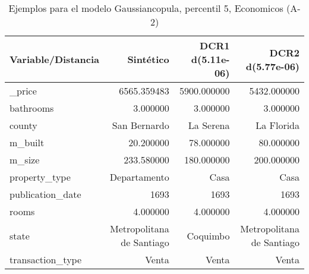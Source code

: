 \begin{table}[H]
\centering
\fontsize{10}{14}\selectfont
\caption{Ejemplos para el modelo Gaussiancopula, percentil 5, Economicos (A-2)}
\label{table-example-economicos-a-2-gaussiancopula-5p}
\begin{tabular}{|l|r|r|r|}
\hline
\rowcolor[gray]{0.8}
Variable/Distancia & Sintético & DCR1 d(5.11e-06) & DCR2 d(5.77e-06) \\
\hline \_price & \cellcolor[rgb]{0.9, 0.54, 0.52} 6565.359483 & 5900.000000 & 5432.000000 \\
\hline bathrooms & \cellcolor[rgb]{0.9, 0.54, 0.52} 3.000000 & \cellcolor[rgb]{0.9, 0.54, 0.52} 3.000000 & \cellcolor[rgb]{0.9, 0.54, 0.52} 3.000000 \\
\hline county & \cellcolor[rgb]{0.9, 0.54, 0.52} San Bernardo & La Serena & La Florida \\
\hline m\_built & \cellcolor[rgb]{0.9, 0.54, 0.52} 20.200000 & 78.000000 & 80.000000 \\
\hline m\_size & \cellcolor[rgb]{0.9, 0.54, 0.52} 233.580000 & 180.000000 & 200.000000 \\
\hline property\_type & \cellcolor[rgb]{0.9, 0.54, 0.52} Departamento & Casa & Casa \\
\hline publication\_date & \cellcolor[rgb]{0.9, 0.54, 0.52} 1693 & \cellcolor[rgb]{0.9, 0.54, 0.52} 1693 & \cellcolor[rgb]{0.9, 0.54, 0.52} 1693 \\
\hline rooms & \cellcolor[rgb]{0.9, 0.54, 0.52} 4.000000 & \cellcolor[rgb]{0.9, 0.54, 0.52} 4.000000 & \cellcolor[rgb]{0.9, 0.54, 0.52} 4.000000 \\
\hline state & \cellcolor[rgb]{0.9, 0.54, 0.52} Metropolitana de Santiago & Coquimbo & \cellcolor[rgb]{0.9, 0.54, 0.52} Metropolitana de Santiago \\
\hline transaction\_type & \cellcolor[rgb]{0.9, 0.54, 0.52} Venta & \cellcolor[rgb]{0.9, 0.54, 0.52} Venta & \cellcolor[rgb]{0.9, 0.54, 0.52} Venta \\
\hline
\end{tabular}
\end{table}
